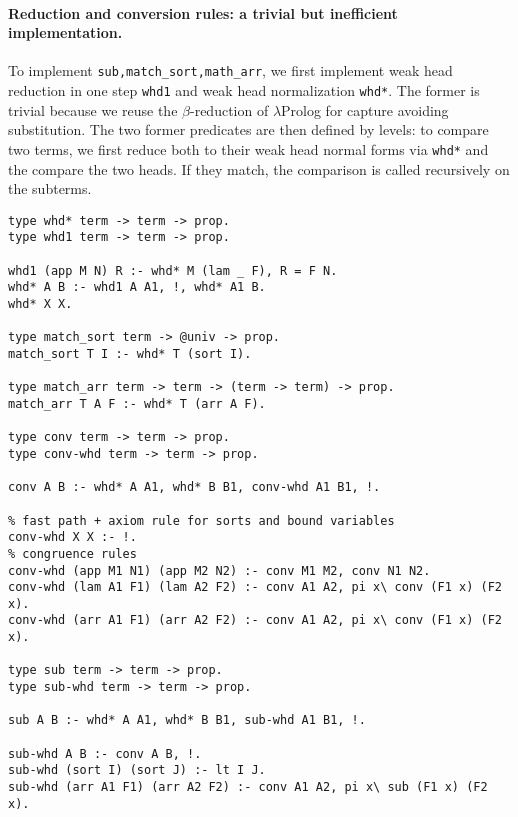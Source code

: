 \documentclass{easychair}
\begin{document}
\paragraph{Reduction and conversion rules: a trivial but inefficient implementation. }\label{sec:inefficient}
To implement \verb+sub,match_sort,math_arr+, we first implement weak head
reduction in one step \verb+whd1+ and weak head normalization \verb+whd*+.
The former is trivial because we reuse the $\beta$-reduction of $\lambda$Prolog for capture avoiding substitution. The two former predicates are then defined by levels: to compare two terms, we first reduce both to their weak head normal forms via \verb+whd*+ and the compare the two heads. If they match, the comparison is called recursively on the subterms.

\begin{verbatim}
type whd* term -> term -> prop.
type whd1 term -> term -> prop.

whd1 (app M N) R :- whd* M (lam _ F), R = F N.
whd* A B :- whd1 A A1, !, whd* A1 B.
whd* X X.

type match_sort term -> @univ -> prop.
match_sort T I :- whd* T (sort I).

type match_arr term -> term -> (term -> term) -> prop.
match_arr T A F :- whd* T (arr A F).

type conv term -> term -> prop.
type conv-whd term -> term -> prop.

conv A B :- whd* A A1, whd* B B1, conv-whd A1 B1, !.

% fast path + axiom rule for sorts and bound variables
conv-whd X X :- !.
% congruence rules
conv-whd (app M1 N1) (app M2 N2) :- conv M1 M2, conv N1 N2.
conv-whd (lam A1 F1) (lam A2 F2) :- conv A1 A2, pi x\ conv (F1 x) (F2 x).
conv-whd (arr A1 F1) (arr A2 F2) :- conv A1 A2, pi x\ conv (F1 x) (F2 x).

type sub term -> term -> prop.
type sub-whd term -> term -> prop.

sub A B :- whd* A A1, whd* B B1, sub-whd A1 B1, !.

sub-whd A B :- conv A B, !.
sub-whd (sort I) (sort J) :- lt I J.
sub-whd (arr A1 F1) (arr A2 F2) :- conv A1 A2, pi x\ sub (F1 x) (F2 x).
\end{verbatim}

\end{document}
